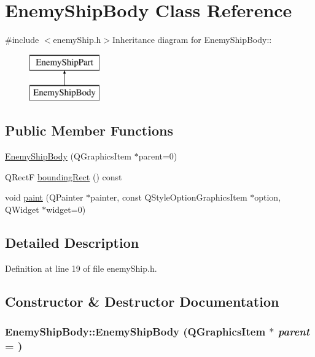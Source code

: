 \hypertarget{class_enemy_ship_body}{
\section{EnemyShipBody Class Reference}
\label{class_enemy_ship_body}
}


{\ttfamily \#include $<$enemyShip.h$>$}Inheritance diagram for EnemyShipBody::\begin{figure}[H]
\begin{center}
\leavevmode
\includegraphics[height=2cm]{class_enemy_ship_body}
\end{center}
\end{figure}
\subsection*{Public Member Functions}
\begin{DoxyCompactItemize}
\item 
\hyperlink{class_enemy_ship_body_ad7c7f90300c36f0fc7280bca93c5ee4f}{EnemyShipBody} (QGraphicsItem $\ast$parent=0)
\item 
QRectF \hyperlink{class_enemy_ship_body_a71c7c2e11c0fbb94d7fa9a7bc049e61e}{boundingRect} () const 
\item 
void \hyperlink{class_enemy_ship_body_a0b951ebac49d2fcdff2e460b050bd82e}{paint} (QPainter $\ast$painter, const QStyleOptionGraphicsItem $\ast$option, QWidget $\ast$widget=0)
\end{DoxyCompactItemize}


\subsection{Detailed Description}


Definition at line 19 of file enemyShip.h.

\subsection{Constructor \& Destructor Documentation}
\hypertarget{class_enemy_ship_body_ad7c7f90300c36f0fc7280bca93c5ee4f}{
\subsubsection[{EnemyShipBody}]{\setlength{\rightskip}{0pt plus 5cm}EnemyShipBody::EnemyShipBody (QGraphicsItem $\ast$ {\em parent} = {})}}
\label{class_enemy_ship_body_ad7c7f90300c36f0fc7280bca93c5ee4f}


